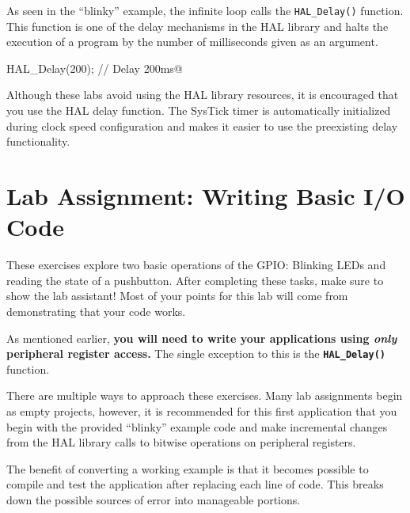 \documentclass[11pt,fleqn]{book} %
\makeatletter
\newcommand{\ilcode}[1]{
    \smallskip
    \colorbox{gray!20!white}{
        \centering
        \parbox{\linewidth-2\fboxsep}{
            \lstinline@#1@
        }
    }
}
\makeatother
\begin{document}
As seen in the ``blinky'' example, the infinite loop calls the \texttt{HAL\_Delay()} function. This function is one of the delay mechanisms in the HAL library and halts the execution of a program by the number of milliseconds given as an argument. 

\ilcode{HAL_Delay(200); // Delay 200ms}

\noindent Although these labs avoid using the HAL library resources, it is encouraged that you use the HAL delay function. The SysTick timer is automatically initialized during clock speed configuration and makes it easier to use the preexisting delay functionality. 



\section{Lab Assignment: Writing Basic I/O Code}

These exercises explore two basic operations of the GPIO: Blinking LEDs and reading the state of a pushbutton.
After completing these tasks, make sure to show the lab assistant! Most of your points for this lab will come from demonstrating that your code works. 
\begin{warning}
As mentioned earlier, \textbf{you will need to write your applications using \textit{only} peripheral register access.} The single exception to this is the \texttt{\textbf{HAL\_Delay()}} function.
\end{warning}

There are multiple ways to approach these exercises. Many lab assignments begin as empty projects, however, it is recommended for this first application that you begin with the provided ``blinky'' example code and make incremental changes from the HAL library calls to bitwise operations on peripheral registers.

The benefit of converting a working example is that it becomes possible to compile and test the application after replacing each line of code. This breaks down the possible sources of error into manageable portions. 
\end{document}
